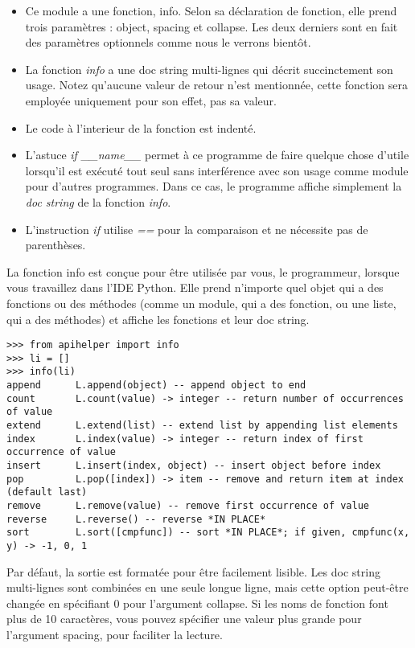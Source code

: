 \begin{itemize}
    \item{Ce module a une fonction, info. Selon sa déclaration de fonction, elle prend trois paramètres : object, spacing et collapse. Les deux derniers sont en fait des paramètres optionnels comme nous le verrons bientôt.}
    \item{La fonction \emph{info} a une doc string multi-lignes qui décrit succinctement son usage. Notez qu’aucune valeur de retour n’est mentionnée, cette fonction sera employée uniquement pour son effet, pas sa valeur.}
    \item{Le code à l’interieur de la fonction est indenté.}
    \item{L’astuce \emph{if \_\_name\_\_} permet à ce programme de faire quelque chose d’utile lorsqu’il est exécuté tout seul sans interférence avec son usage comme module pour d’autres programmes. Dans ce cas, le programme affiche simplement la \emph{doc string} de la fonction \emph{info}.}
    \item{L’instruction \emph{if} utilise \emph{==} pour la comparaison et ne nécessite pas de parenthèses.}
\end{itemize}

La fonction info est conçue pour être utilisée par vous, le programmeur, lorsque vous travaillez dans l’IDE Python. Elle prend n’importe quel objet qui a des fonctions ou des méthodes (comme un module, qui a des fonction, ou une liste, qui a des méthodes) et affiche les fonctions et leur doc string. 

\begin{example}
\begin{lstlisting}
>>> from apihelper import info
>>> li = []
>>> info(li)
append      L.append(object) -- append object to end
count       L.count(value) -> integer -- return number of occurrences of value
extend      L.extend(list) -- extend list by appending list elements
index       L.index(value) -> integer -- return index of first occurrence of value
insert      L.insert(index, object) -- insert object before index
pop         L.pop([index]) -> item -- remove and return item at index (default last)
remove      L.remove(value) -- remove first occurrence of value
reverse     L.reverse() -- reverse *IN PLACE*
sort        L.sort([cmpfunc]) -- sort *IN PLACE*; if given, cmpfunc(x, y) -> -1, 0, 1
\end{lstlisting}
\end{example}

Par défaut, la sortie est formatée pour être facilement lisible. Les doc string multi-lignes sont combinées en une seule longue ligne, mais cette option peut-être changée en spécifiant 0 pour l’argument collapse. Si les noms de fonction font plus de 10 caractères, vous pouvez spécifier une valeur plus grande pour l’argument  spacing, pour faciliter la lecture.

